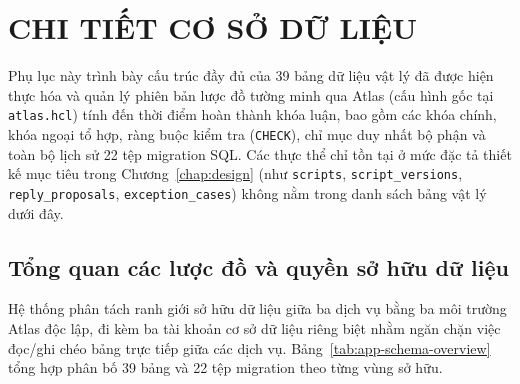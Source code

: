 \chapter{CHI TIẾT CƠ SỞ DỮ LIỆU}\label{app:database}

Phụ lục này trình bày cấu trúc đầy đủ của 39 bảng dữ liệu vật lý đã được hiện thực hóa và quản lý phiên bản lược đồ tường minh qua Atlas (cấu hình gốc tại \texttt{atlas.hcl}) tính đến thời điểm hoàn thành khóa luận, bao gồm các khóa chính, khóa ngoại tổ hợp, ràng buộc kiểm tra (\texttt{CHECK}), chỉ mục duy nhất bộ phận và toàn bộ lịch sử 22 tệp migration SQL. Các thực thể chỉ tồn tại ở mức đặc tả thiết kế mục tiêu trong Chương~\ref{chap:design} (như \texttt{scripts}, \texttt{script\_\hspace{0pt}versions}, \texttt{reply\_\hspace{0pt}proposals}, \texttt{exception\_\hspace{0pt}cases}) không nằm trong danh sách bảng vật lý dưới đây.

\section{Tổng quan các lược đồ và quyền sở hữu dữ liệu}
Hệ thống phân tách ranh giới sở hữu dữ liệu giữa ba dịch vụ bằng ba môi trường Atlas độc lập, đi kèm ba tài khoản cơ sở dữ liệu riêng biệt nhằm ngăn chặn việc đọc/ghi chéo bảng trực tiếp giữa các dịch vụ. Bảng~\ref{tab:app-schema-overview} tổng hợp phân bố 39 bảng và 22 tệp migration theo từng vùng sở hữu.

